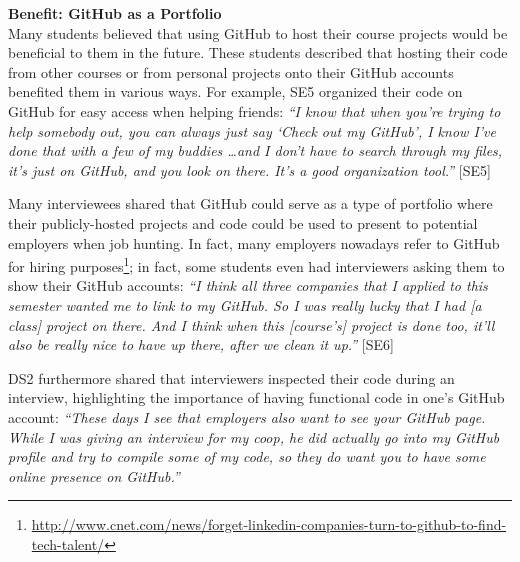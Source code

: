 
\textbf{Benefit: GitHub as a Portfolio} \\
Many students believed that using GitHub to host their course projects would be beneficial to them in the future. These students described that hosting their code from other courses or from personal projects onto their GitHub accounts benefited them in various ways. For example, SE5 organized their code on GitHub for easy access when helping friends: \textit{``I know that when you're trying to help somebody out, you can always just say `Check out my GitHub', I know I've done that with a few of my buddies \ldots and I don't have to search through my files, it's just on GitHub, and you look on there. It's a good organization tool.''} [SE5]

Many interviewees shared that GitHub could serve as a type of portfolio where their publicly-hosted projects and code could be used to present to potential employers when job hunting. In fact, many employers nowadays refer to GitHub for hiring purposes\footnote{\url{http://www.cnet.com/news/forget-linkedin-companies-turn-to-github-to-find-tech-talent/}}; in fact, some students even had interviewers asking them to show their GitHub accounts: \textit{``I think all three companies that I applied to this semester wanted me to link to my GitHub. So I was really lucky that I had [a class] project on there. And I think when this [course's] project is done too, it'll also be really nice to have up there, after we clean it up.''} [SE6]

DS2 furthermore shared that interviewers inspected their code during an interview, highlighting the importance of having functional code in one's GitHub account: \textit{``These days I see that employers also want to see your GitHub page. While I was giving an interview for my coop, he did actually go into my GitHub profile and try to compile some of my code, so they do want you to have some online presence on GitHub.''}


